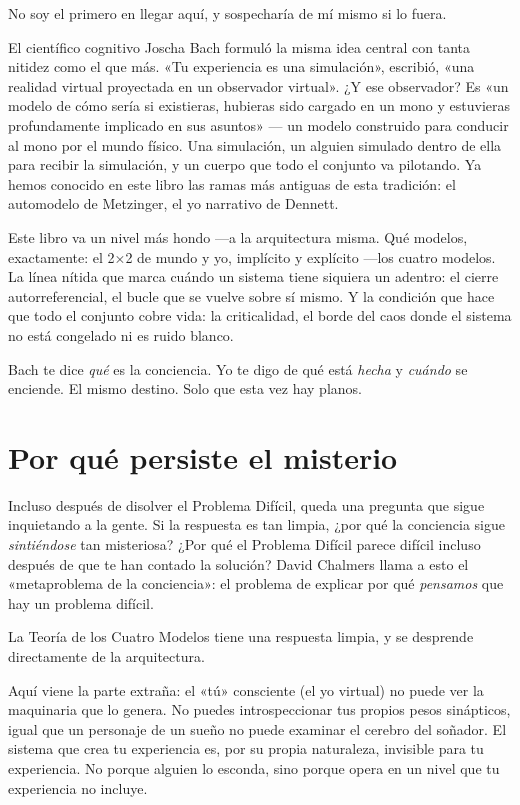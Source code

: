 \documentclass[11pt, twoside, openright]{book}
\begin{document}
No soy el primero en llegar aquí, y sospecharía de mí mismo si lo fuera.

El científico cognitivo Joscha Bach formuló la misma idea central con tanta nitidez como el que más. «Tu experiencia es una simulación», escribió, «una realidad virtual proyectada en un observador virtual». ¿Y ese observador? Es «un modelo de cómo sería si existieras, hubieras sido cargado en un mono y estuvieras profundamente implicado en sus asuntos» --- un modelo construido para conducir al mono por el mundo físico. Una simulación, un alguien simulado dentro de ella para recibir la simulación, y un cuerpo que todo el conjunto va pilotando. Ya hemos conocido en este libro las ramas más antiguas de esta tradición: el automodelo de Metzinger, el yo narrativo de Dennett.

Este libro va un nivel más hondo ---a la arquitectura misma. Qué modelos, exactamente: el 2×2 de mundo y yo, implícito y explícito ---los cuatro modelos. La línea nítida que marca cuándo un sistema tiene siquiera un adentro: el cierre autorreferencial, el bucle que se vuelve sobre sí mismo. Y la condición que hace que todo el conjunto cobre vida: la criticalidad, el borde del caos donde el sistema no está congelado ni es ruido blanco.

Bach te dice \textit{qué} es la conciencia. Yo te digo de qué está \textit{hecha} y \textit{cuándo} se enciende. El mismo destino. Solo que esta vez hay planos.

\section*{Por qué persiste el misterio}

Incluso después de disolver el Problema Difícil, queda una pregunta que sigue inquietando a la gente. Si la respuesta es tan limpia, ¿por qué la conciencia sigue \textit{sintiéndose} tan misteriosa? ¿Por qué el Problema Difícil parece difícil incluso después de que te han contado la solución? David Chalmers llama a esto el «metaproblema de la conciencia»: el problema de explicar por qué \textit{pensamos} que hay un problema difícil.

La Teoría de los Cuatro Modelos tiene una respuesta limpia, y se desprende directamente de la arquitectura.

Aquí viene la parte extraña: el «tú» consciente (el yo virtual) no puede ver la maquinaria que lo genera. No puedes introspeccionar tus propios pesos sinápticos, igual que un personaje de un sueño no puede examinar el cerebro del soñador. El sistema que crea tu experiencia es, por su propia naturaleza, invisible para tu experiencia. No porque alguien lo esconda, sino porque opera en un nivel que tu experiencia no incluye.
\end{document}
